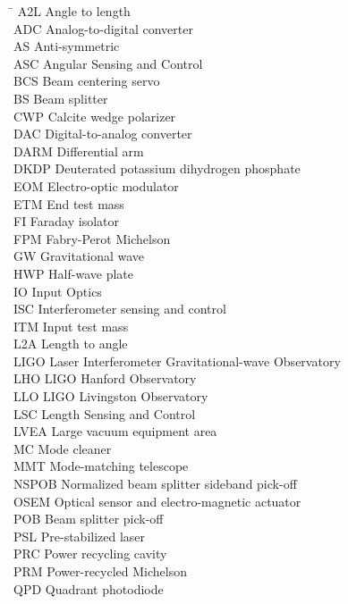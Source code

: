 \begin{tabbing}
\hspace{1in} \= \kill
A2L \> Angle to length \\
ADC \> Analog-to-digital converter \\
AS \> Anti-symmetric \\
ASC \> Angular Sensing and Control \\
BCS \> Beam centering servo \\
BS \> Beam splitter \\
CWP \> Calcite wedge polarizer \\
DAC \> Digital-to-analog converter\\
DARM \> Differential arm \\
DKDP \> Deuterated potassium dihydrogen phosphate \\
EOM \> Electro-optic modulator \\
ETM \> End test mass \\
FI \> Faraday isolator \\
FPM \> Fabry-Perot Michelson \\
GW \> Gravitational wave \\
HWP \> Half-wave plate \\
IO \> Input Optics \\
ISC \> Interferometer sensing and control \\
ITM \> Input test mass \\
L2A \> Length to angle \\
LIGO \> Laser Interferometer Gravitational-wave Observatory \\
LHO \> LIGO Hanford Observatory \\
LLO \> LIGO Livingston Observatory \\
LSC \> Length Sensing and Control \\
LVEA \> Large vacuum equipment area \\
MC \> Mode cleaner \\
MMT \> Mode-matching telescope \\
NSPOB \> Normalized beam splitter sideband pick-off \\
OSEM \> Optical sensor and electro-magnetic actuator \\
POB \> Beam splitter pick-off \\
PSL \> Pre-stabilized laser \\
PRC \> Power recycling cavity \\
PRM \> Power-recycled Michelson \\
QPD \> Quadrant photodiode \\

\end{tabbing}
